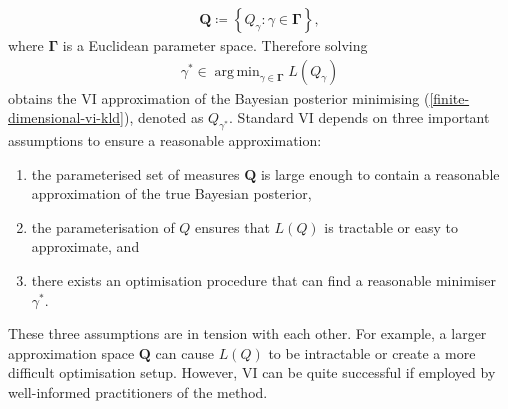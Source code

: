 \documentclass{article}
\DeclareMathOperator*{\argmin}{arg\,min}
\numberwithin{equation}{section}
\begin{document}
\begin{align}
    \boldsymbol{Q} \coloneqq \left\{Q_{\gamma}: \gamma \in \boldsymbol{\Gamma} \right\},
\end{align}
where $\boldsymbol{\Gamma}$ is a Euclidean parameter space. Therefore solving
\begin{align}
    \gamma^* \in \argmin_{\gamma \in \boldsymbol{\Gamma}} L(Q_{\gamma})
\end{align}
obtains the VI approximation of the Bayesian posterior minimising (\ref{finite-dimensional-vi-kld}), denoted as $Q_{\gamma^*}$. 
Standard VI depends on three important assumptions to ensure a reasonable approximation:
\begin{enumerate}
    \setlength\itemsep{-0.25em}
    \item the parameterised set of measures $\boldsymbol{Q}$ is large enough to contain a reasonable approximation of the true Bayesian posterior,
    \item the parameterisation of $Q$ ensures that $L(Q)$ is tractable or easy to approximate, and
    \item there exists an optimisation procedure that can find a reasonable minimiser $\gamma^*$.
\end{enumerate}
These three assumptions are in tension with each other.
For example, a larger approximation space $\boldsymbol{Q}$ can cause $L(Q)$ to be intractable or create a more difficult optimisation setup.
However, VI can be quite successful if employed by well-informed practitioners of the method.
\end{document}
